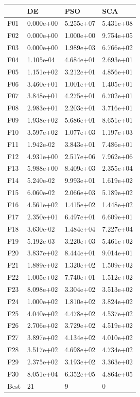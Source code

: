 \begin{tabular}{llll}
\toprule
{} &         DE &        PSO &        SCA \\
\midrule
F01  &  0.000e+00 &  5.255e+07 &  5.431e+08 \\
F02  &  0.000e+00 &  1.000e+00 &  9.754e+05 \\
F03  &  0.000e+00 &  1.989e+03 &  6.766e+02 \\
F04  &  1.105e-04 &  4.684e+01 &  2.693e+01 \\
F05  &  1.151e+02 &  3.212e+01 &  4.856e+01 \\
F06  &  3.460e+01 &  1.001e+01 &  1.405e+01 \\
F07  &  3.848e+01 &  4.275e+01 &  6.702e+01 \\
F08  &  2.983e+01 &  2.203e+01 &  3.716e+01 \\
F09  &  1.938e+02 &  5.686e+01 &  8.651e+01 \\
F10  &  3.597e+02 &  1.077e+03 &  1.197e+03 \\
F11  &  1.942e-02 &  3.843e+01 &  7.486e+01 \\
F12  &  4.931e+00 &  2.517e+06 &  7.962e+06 \\
F13  &  5.988e+00 &  8.409e+03 &  2.355e+04 \\
F14  &  5.240e-02 &  9.993e+01 &  1.619e+02 \\
F15  &  6.060e-02 &  2.066e+03 &  5.189e+02 \\
F16  &  4.561e+02 &  1.415e+02 &  1.448e+02 \\
F17  &  2.350e+01 &  6.497e+01 &  6.609e+01 \\
F18  &  3.630e-02 &  1.484e+04 &  7.227e+04 \\
F19  &  5.192e-03 &  3.220e+03 &  5.461e+02 \\
F20  &  3.837e+02 &  8.444e+01 &  9.014e+01 \\
F21  &  1.889e+02 &  1.320e+02 &  1.509e+02 \\
F22  &  1.005e+02 &  7.740e+01 &  1.512e+02 \\
F23  &  8.098e+02 &  3.304e+02 &  3.513e+02 \\
F24  &  1.000e+02 &  1.810e+02 &  3.824e+02 \\
F25  &  4.040e+02 &  4.478e+02 &  4.537e+02 \\
F26  &  2.706e+02 &  3.729e+02 &  4.519e+02 \\
F27  &  3.897e+02 &  4.134e+02 &  4.010e+02 \\
F28  &  3.517e+02 &  4.698e+02 &  4.734e+02 \\
F29  &  2.375e+02 &  3.193e+02 &  3.363e+02 \\
F30  &  8.051e+04 &  6.352e+05 &  4.864e+05 \\
Best &         21 &          9 &          0 \\
\bottomrule
\end{tabular}
